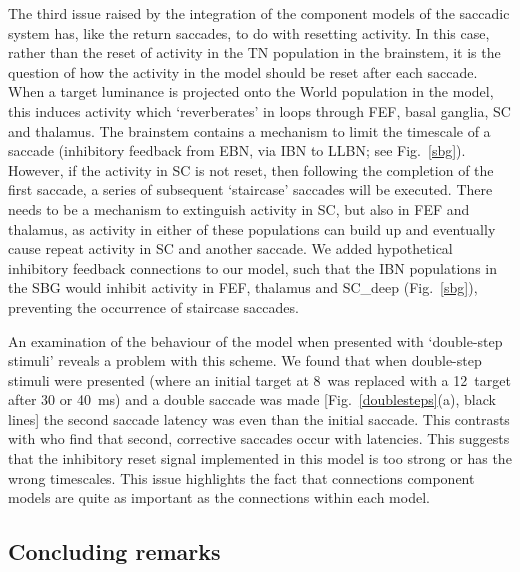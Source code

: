 \documentclass{frontiersSCNS}
\begin{document}
The third issue raised by the integration of the component models of
the saccadic system has, like the return saccades, to do with
resetting activity. In this case, rather than the reset of activity in
the TN population in the brainstem, it is the question of how the
activity in the  model should be reset after each
saccade. When a target luminance is projected onto the World
population in the model, this induces activity which `reverberates' in
loops through FEF, basal ganglia, SC and thalamus. The brainstem
contains a mechanism to limit the timescale of a saccade (inhibitory
feedback from EBN, via IBN to LLBN; see Fig.~\ref{sbg}). However, if
the activity in SC is not reset, then following the completion of the
first saccade, a series of subsequent `staircase' saccades will be
executed. There needs to be a mechanism to extinguish activity in SC,
but also in FEF and thalamus, as activity in either of these
populations can build up and eventually cause repeat activity in SC
and another saccade. We added hypothetical inhibitory feedback
connections to our model, such that the IBN populations in the SBG
would inhibit activity in FEF, thalamus and SC\_deep (Fig.~\ref{sbg}),
preventing the occurrence of staircase saccades.

An examination of the behaviour of the model when presented with
`double-step stimuli' reveals a problem with this scheme. We found
that when double-step stimuli were presented (where an initial target
at 8\dg~was replaced with a 12\dg~target after 30 or 40~ms) and a
double saccade was made [Fig.~\ref{doublesteps}(a), black lines] the
second saccade latency was  even than the initial
saccade. This contrasts with \cite{becker_analysis_1979} who find that
second, corrective saccades occur with  latencies.  This
suggests that the inhibitory reset signal implemented in this model is
too strong or has the wrong timescales. This issue highlights the fact
that connections  component models are quite as important
as the connections within each model.

\subsection{Concluding remarks}
\end{document}
